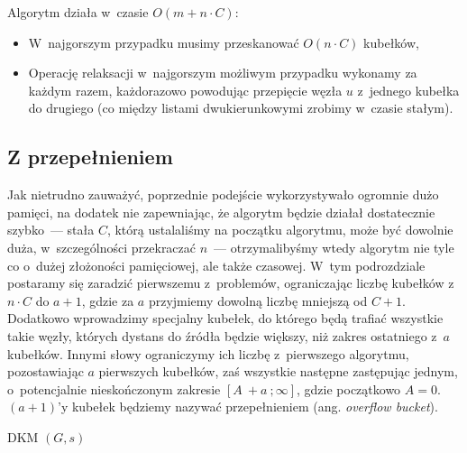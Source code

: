 Algorytm działa w~czasie $ O \left( m + n \cdot C \right) $:

\begin{itemize}
\item W~najgorszym przypadku musimy przeskanować $ O \left( n \cdot C \right)$ kubełków,
\item Operację relaksacji w~najgorszym możliwym przypadku wykonamy za każdym razem, każdorazowo powodując przepięcie węzła $u$ z~jednego kubełka do drugiego (co między listami dwukierunkowymi zrobimy w~czasie stałym).
\end{itemize}

\subsection{Z przepełnieniem}

Jak nietrudno zauważyć, poprzednie podejście wykorzystywało ogromnie dużo pamięci, na dodatek nie zapewniając, że algorytm będzie działał dostatecznie szybko~--- stała $C$, którą ustalaliśmy na początku algorytmu, może być dowolnie duża, w~szczególności przekraczać $n$~--- otrzymalibyśmy wtedy algorytm nie tyle co o~dużej złożoności pamięciowej, ale także czasowej. W~tym podrozdziale postaramy się zaradzić pierwszemu z~problemów, ograniczając liczbę kubełków z~$n \cdot C$ do $a + 1$, gdzie za $a$ przyjmiemy dowolną liczbę mniejszą od $C + 1$. Dodatkowo wprowadzimy specjalny kubełek, do którego będą trafiać wszystkie takie węzły, których dystans do źródła będzie większy, niż zakres ostatniego z~$a$ kubełków. Innymi słowy ograniczymy ich liczbę z~pierwszego algorytmu, pozostawiając $a$ pierwszych kubełków, zaś wszystkie następne zastępując jednym, o~potencjalnie nieskończonym zakresie $ \left [ A~+ a~; \infty \right] $, gdzie początkowo $A = 0$. $\left( a + 1 \right)$'y kubełek będziemy nazywać przepełnieniem (ang. \textit{overflow bucket}).

\begin{algorithm}[!htbp]
\DontPrintSemicolon
{}
\caption{ DKM $\left( G, s \right)$\label{alg:OverflowBucket}}
\end{algorithm}

